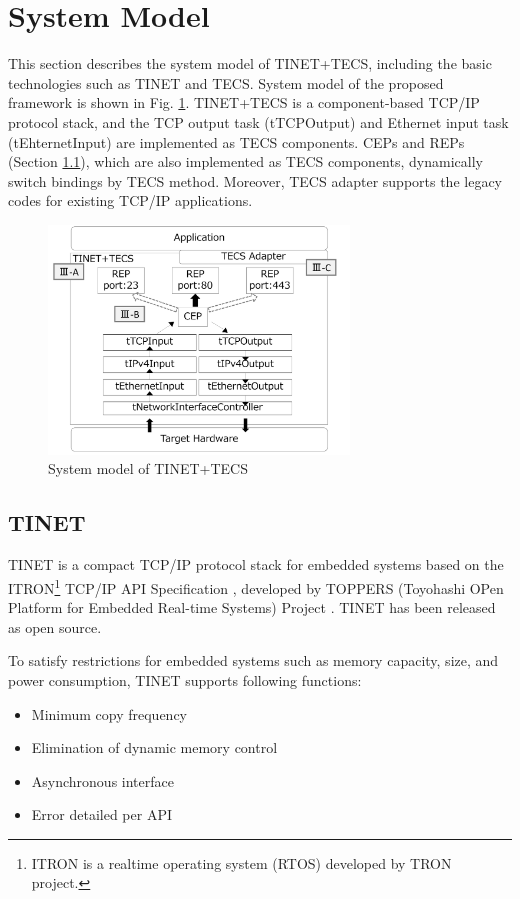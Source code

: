 \documentclass[conference]{IEEEtran/IEEEtran}
\begin{document}
\section{System Model}
\label{sec:System Model}

This section describes the system model of TINET+TECS, including the basic technologies such as TINET and TECS.
System model of the proposed framework is shown in Fig. \ref{fig:SystemModel}.
TINET+TECS is a component-based TCP/IP protocol stack, and the TCP output task (tTCPOutput) and Ethernet input task (tEhternetInput) are implemented as TECS components.
CEPs and REPs (Section \ref{sec:TINET}), which are also implemented as TECS components, dynamically switch bindings by TECS method.
Moreover, TECS adapter supports the legacy codes for existing TCP/IP applications.


\begin{figure}[t]
    \centering
    \includegraphics[width=8.0cm,clip]{figure/SystemModel.pdf}
    \caption{System model of TINET+TECS}
    \label{fig:SystemModel}
\end{figure}

\subsection{TINET}
\label{sec:TINET}

TINET is a compact TCP/IP protocol stack for embedded systems based on the ITRON\footnote{ITRON is a realtime operating system (RTOS) developed by TRON project.} TCP/IP API Specification \cite{url:ITRON_TCP/IP_API_Spec}, developed by TOPPERS (Toyohashi OPen Platform for Embedded Real-time Systems) Project \cite{url:TOPPERS}.
TINET has been released as open source.

To satisfy restrictions for embedded systems such as memory capacity, size, and power consumption, TINET supports following functions:

\begin{itemize}
    \item Minimum copy frequency
    \item Elimination of dynamic memory control
    \item Asynchronous interface
    \item Error detailed per API
\end{itemize}
\end{document}
